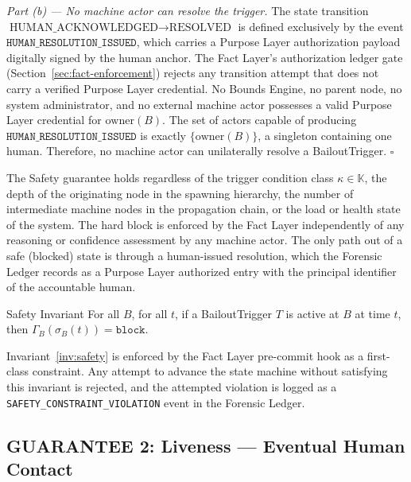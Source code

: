 \medskip

\noindent\textit{Part (b) — No machine actor can resolve the trigger.} The state transition $\text{HUMAN\_ACKNOWLEDGED} \rightarrow \text{RESOLVED}$ is defined exclusively by the event $\texttt{HUMAN\_RESOLUTION\_ISSUED}$, which carries a Purpose Layer authorization payload digitally signed by the human anchor. The Fact Layer's authorization ledger gate (Section~\ref{sec:fact-enforcement}) rejects any transition attempt that does not carry a verified Purpose Layer credential. No Bounds Engine, no parent node, no system administrator, and no external machine actor possesses a valid Purpose Layer credential for $\text{owner}(B)$. The set of actors capable of producing $\texttt{HUMAN\_RESOLUTION\_ISSUED}$ is exactly $\{\text{owner}(B)\}$, a singleton containing one human. Therefore, no machine actor can unilaterally resolve a BailoutTrigger. $\square$

\bigskip

The Safety guarantee holds regardless of the trigger condition class $\kappa \in \mathbb{K}$, the depth of the originating node in the spawning hierarchy, the number of intermediate machine nodes in the propagation chain, or the load or health state of the system. The hard block is enforced by the Fact Layer independently of any reasoning or confidence assessment by any machine actor. The only path out of a safe (blocked) state is through a human-issued resolution, which the Forensic Ledger records as a Purpose Layer authorized entry with the principal identifier of the accountable human.

\begin{invariant}{Safety Invariant}
\label{inv:safety}
For all $B$, for all $t$, if a BailoutTrigger $T$ is active at $B$ at time $t$, then $\Gamma_B(\sigma_B(t)) = \texttt{block}$.
\end{invariant}

Invariant~\ref{inv:safety} is enforced by the Fact Layer pre-commit hook as a first-class constraint. Any attempt to advance the state machine without satisfying this invariant is rejected, and the attempted violation is logged as a \texttt{SAFETY\_CONSTRAINT\_VIOLATION} event in the Forensic Ledger.

\subsection{GUARANTEE 2: Liveness — Eventual Human Contact}
\label{sec:guarantee-liveness}

